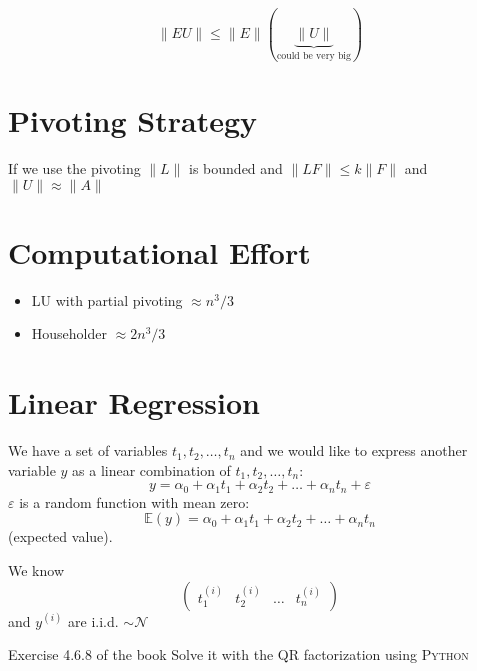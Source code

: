 \begin{mdframed}[backgroundcolor=blue!20]
\[\|EU\| \leq \|E\|(\underbrace{\|U\|}_{\text{could be very big}})\]
\end{mdframed}

\section*{Pivoting Strategy}

If we use the pivoting $\|L\|$ is bounded and $\|LF\| \leq k\|F\|$ and $\|U\| \approx \|A\|$

\section*{Computational Effort}

\begin{itemize}
\item LU with partial pivoting $\approx n^3/3$
\item Householder $\approx 2n^3/3$
\end{itemize}

\section{Linear Regression}





We have a set of variables $t_1, t_2, \ldots, t_n$ and we would like to express another variable $y$ as a linear combination of $t_1, t_2, \ldots, t_n$:
\[
y = \alpha_0 + \alpha_1 t_1 + \alpha_2 t_2 + \ldots + \alpha_n t_n + \varepsilon
\]
$\varepsilon$ is a random function with mean zero:
\[
\mathbb{E}(y) = \alpha_0 + \alpha_1 t_1 + \alpha_2 t_2 + \ldots + \alpha_n t_n
\]
(expected value).

We know
\[
\begin{pmatrix}
t_1^{(i)} & t_2^{(i)} & \ldots & t_n^{(i)}
\end{pmatrix}
\]
and $y^{(i)}$ are i.i.d. $\sim \mathcal{N}$

\begin{mdframed}[backgroundcolor=blue!20]
Exercise 4.6.8 of the book
Solve it with the QR factorization using \textsc{Python}
\end{mdframed}
